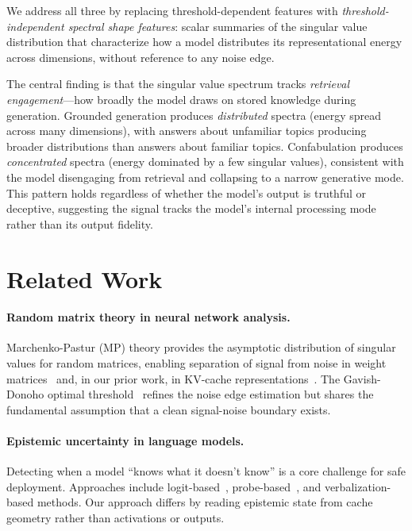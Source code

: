 \documentclass[11pt,a4paper]{article}
\begin{document}
We address all three by replacing threshold-dependent features with
\emph{threshold-independent spectral shape features}: scalar summaries
of the singular value distribution that characterize how a model
distributes its representational energy across dimensions, without
reference to any noise edge.

The central finding is that the singular value spectrum tracks
\emph{retrieval engagement}---how broadly the model draws on stored
knowledge during generation. Grounded generation produces
\emph{distributed} spectra (energy spread across many dimensions),
with answers about unfamiliar topics producing broader distributions
than answers about familiar topics. Confabulation produces
\emph{concentrated} spectra (energy dominated by a few singular
values), consistent with the model disengaging from retrieval and
collapsing to a narrow generative mode. This pattern holds regardless
of whether the model's output is truthful or deceptive, suggesting
the signal tracks the model's internal processing mode rather than its
output fidelity.

\section{Related Work}
\label{sec:related}

\paragraph{Random matrix theory in neural network analysis.}
Marchenko-Pastur (MP) theory provides the asymptotic distribution of
singular values for random matrices, enabling separation of signal
from noise in weight matrices~\citep{martin2021implicit} and, in our
prior work, in KV-cache representations~\citep{lyra_p2}. The
Gavish-Donoho optimal threshold~\citep{gavish2014optimal} refines the
noise edge estimation but shares the fundamental assumption that a
clean signal-noise boundary exists.

\paragraph{Epistemic uncertainty in language models.}
Detecting when a model ``knows what it doesn't know'' is a core
challenge for safe deployment. Approaches include
logit-based~\citep{kadavath2022language}, probe-based~\citep{azaria2023internal,
  burns2023discovering}, and verbalization-based methods. Our approach
differs by reading epistemic state from cache geometry rather than
activations or outputs.
\end{document}
